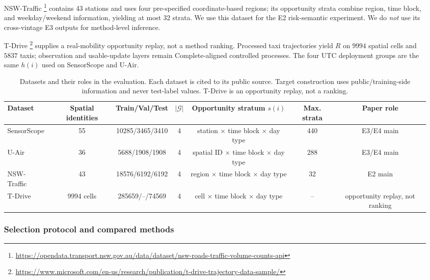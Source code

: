 \documentclass[letterpaper,journal]{IEEEtran}
\begin{document}
NSW-Traffic
\cite{tfnsw2024traffic}\footnote{\url{https://opendata.transport.nsw.gov.au/data/dataset/nsw-roads-traffic-volume-counts-api}}
contains 43 stations and uses four pre-specified coordinate-based regions;
its opportunity strata combine region, time block, and weekday/weekend
information, yielding at most 32 strata.  We use this dataset for the E2
risk-semantic experiment.  We do \emph{not} use its cross-vintage E3 outputs for
method-level inference.

T-Drive
\cite{yuan2010tdrive}\footnote{\url{https://www.microsoft.com/en-us/research/publication/t-drive-trajectory-data-sample/}}
supplies a real-mobility opportunity replay, not a
method ranking.  Processed taxi trajectories yield $R$ on $9994$
spatial cells and $5837$ taxis; observation and usable-update layers
remain Complete-aligned controlled processes.  The four UTC deployment
groups are the same $h(i)$ used on SensorScope and U-Air.

\begin{table}[t]
\centering
\caption{Datasets and their roles in the evaluation.  Each dataset is cited to
its public source.  Target construction uses public/training-side information
and never test-label values.  T-Drive is an opportunity replay, not a ranking.}
\label{tab:datasets}
\setlength{\tabcolsep}{4.5pt}
\begin{tabular}{lcccccc}
\toprule
Dataset & Spatial identities & Train/Val/Test & $|\mathcal G|$ &
Opportunity stratum $s(i)$ & Max. strata & Paper role\\
\midrule
SensorScope~\cite{ingelrest2010sensorscope} & 55 & 10285/3465/3410 & 4 &
station $\times$ time block $\times$ day type & 440 & E3/E4 main\\
U-Air~\cite{zheng2013uair} & 36 & 5688/1908/1908 & 4 &
spatial ID $\times$ time block $\times$ day type & 288 & E3/E4 main\\
NSW-Traffic~\cite{tfnsw2024traffic} & 43 & 18576/6192/6192 & 4 &
region $\times$ time block $\times$ day type & 32 & E2 main\\
T-Drive~\cite{yuan2010tdrive} & 9994 cells & 285659/--/74569 & 4 &
cell $\times$ time block $\times$ day type & -- & opportunity replay, not ranking\\
\bottomrule
\end{tabular}
\end{table}

\subsubsection{Selection protocol and compared methods}
\end{document}
